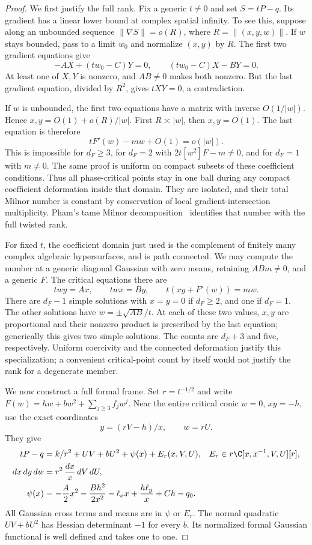 \begin{proof}
We first justify the full rank. Fix a generic $t\ne0$ and set
$S=tP-q$. Its gradient has a linear lower bound at complex spatial
infinity. To see this, suppose along an unbounded sequence
$\|\nabla S\|=o(R)$, where $R=\|(x,y,w)\|$. If $w$ stays
bounded, pass to a limit $w_0$ and normalize $(x,y)$ by $R$.
The first two gradient equations give
\[
 -AX+(tw_0-C)Y=0,\qquad (tw_0-C)X-BY=0.
\]
At least one of $X,Y$ is nonzero, and $AB\ne0$ makes both
nonzero. But the last gradient equation, divided by $R^2$, gives
$tXY=0$, a contradiction.

If $w$ is unbounded, the first two equations have a matrix with
inverse $O(1/|w|)$. Hence
$x,y=O(1)+o(R)/|w|$. First $R\asymp |w|$, then $x,y=O(1)$.
The last equation is therefore
\[
 tF'(w)-mw+O(1)=o(|w|).
\]
This is impossible for $d_F\ge3$, for $d_F=2$ with
$2t[w^2]F-m\ne0$, and for $d_F=1$ with $m\ne0$.
The same proof is uniform on compact subsets of these coefficient
conditions. Thus all phase-critical points stay in one ball during
any compact coefficient deformation inside that domain. They are
isolated, and their total Milnor number is constant by conservation
of local gradient-intersection multiplicity. Pham's tame Milnor
decomposition~\cite[Part~I, Sections~1--4]{Pham} identifies that
number with the full twisted rank.

For fixed $t$, the coefficient domain just used is the complement
of finitely many complex algebraic hypersurfaces, and is path
connected. We may compute the number at a generic diagonal
Gaussian with zero means, retaining $ABm\ne0$, and a generic $F$.
The critical equations there are
\[
 twy=Ax,\qquad twx=By,\qquad t(xy+F'(w))=mw.
\]
There are $d_F-1$ simple solutions with $x=y=0$ if $d_F\ge2$,
and one if $d_F=1$. The other solutions have
$w=\pm\sqrt{AB}/t$. At each of these two values, $x,y$ are
proportional and their nonzero product is prescribed by the last
equation; generically this gives two simple solutions. The counts
are $d_F+3$ and five, respectively. Uniform coercivity and the
connected deformation justify this specialization; a convenient
critical-point count by itself would not justify the rank for a
degenerate member.

We now construct a full formal frame. Set $r=t^{-1/2}$ and write
$F(w)=hw+bw^2+\sum_{j\ge3}f_jw^j$. Near the entire critical
conic $w=0$, $xy=-h$, use the exact coordinates
\[
 y=(rV-h)/x,\qquad w=rU.
\]
They give
\begin{align}
 tP-q&=k/r^2+UV+bU^2+\psi(x)+E_r(x,V,U),
                  &E_r\in r\C[x,x^{-1},V,U][r],\label{eq:conicphase}\\
 dx\,dy\,dw&=r^2\,\frac{dx}{x}\,dV\,dU,\label{eq:conicvolume}\\
 \psi(x)&=-\frac A2x^2-\frac{Bh^2}{2x^2}
                -\ell_x x+\frac{h\ell_y}{x}+Ch-q_0.\notag
\end{align}
All Gaussian cross terms and means are in $\psi$ or $E_r$.
The normal quadratic $UV+bU^2$ has Hessian determinant $-1$ for
every $b$. Its normalized formal Gaussian functional is well
defined and takes one to one.


\end{proof}
